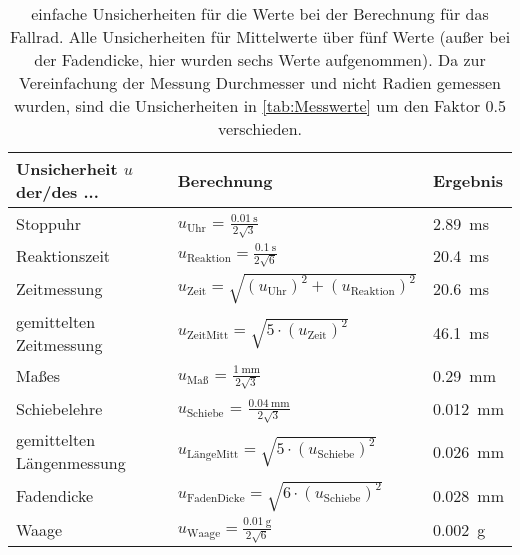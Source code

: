 \documentclass[11pt,a4paper,titlepage, ngerman]{article}
\begin{document}
	\begin{table}[ht]
		\centering
		\caption{einfache Unsicherheiten für die Werte bei der Berechnung für das Fallrad. Alle Unsicherheiten für Mittelwerte über fünf Werte (außer bei der Fadendicke, hier wurden sechs Werte aufgenommen). Da zur Vereinfachung der Messung Durchmesser und nicht Radien gemessen wurden, sind die Unsicherheiten in \ref{tab:Messwerte} um den Faktor 0.5 verschieden.}
		\begin{tabular}{l|l|l}
			{Unsicherheit $u$ der/des ...} & {Berechnung}  & {Ergebnis}\\
			\hline 
			{Stoppuhr} &  {$u_\text{Uhr}$ = $\frac{\SI{0,01}{\second}}{2\sqrt{3}}$} & {\SI{2,89}{\milli\second}} \\
			{Reaktionszeit} & {$u_\text{Reaktion} = \frac{\SI{0,1}{\second}}{2\sqrt{6}}$} & {\SI{20,4}{\milli\second}} \\
			{Zeitmessung} & {$u_\text{Zeit} = \sqrt{\left( u_\text{Uhr}\right) ^2+\left( u_\text{Reaktion}\right) ^2}$} & {\SI{20,6}{\milli\second}} \\
			{gemittelten Zeitmessung} & {$u_\text{ZeitMitt} = \sqrt{5\cdot\left(u_\text{Zeit}\right) ^2}$} & {\SI{46,1}{\milli\second}} \\
			\hline 
			{Maßes} &  {$u_\text{Maß}$ = $\frac{\SI{1}{\mm}}{2\sqrt{3}}$} & {\SI{0,29}{\mm}} \\
			{Schiebelehre} &  {$u_\text{Schiebe}$ = $\frac{\SI{0,04}{\mm}}{2\sqrt{3}}$} & {\SI{0,012}{\mm}} \\
			{gemittelten Längenmessung} &  {$u_\text{LängeMitt} = \sqrt{5\cdot\left(u_\text{Schiebe}\right) ^2}$} & {\SI{0,026}{\mm}} \\
			{Fadendicke} &  {$u_\text{FadenDicke} = \sqrt{6\cdot\left(u_\text{Schiebe}\right) ^2}$} & {\SI{0,028}{\mm}} \\
			\hline
			{Waage} & {$u_\text{Waage} = \frac{\SI{0,01}{\g}}{2\sqrt{6}}$} & \SI{0,002}{\g}{}
		\end{tabular}
	\end{table}
\end{document}
